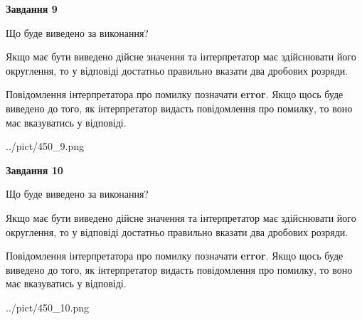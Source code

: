\documentclass[12pt, ukrainian]{article}
\begin{document}
{\begin {Large}
{\begin {center}\textbf{Завдання 9}\end {center}}\par
Що буде виведено за виконання? \par

Якщо має бути виведено дійсне значення та інтерпретатор має здійснювати його округлення, 
то у відповіді достатньо правильно вказати два дробових розряди.

Повідомлення інтерпретатора про помилку позначати \textbf{error}.
Якщо щось буде виведено до того, як інтерпретатор видасть повідомлення про помилку, 
то воно має вказуватись у відповіді. \par

\begin{center}
	{../pict/450_9.png}
\end{center}
\newpage

{\begin {center}\textbf{Завдання 10}\end {center}}\par
Що буде виведено за виконання? \par

Якщо має бути виведено дійсне значення та інтерпретатор має здійснювати його округлення, 
то у відповіді достатньо правильно вказати два дробових розряди.

Повідомлення інтерпретатора про помилку позначати \textbf{error}.
Якщо щось буде виведено до того, як інтерпретатор видасть повідомлення про помилку, 
то воно має вказуватись у відповіді. \par

\begin{center}
	{../pict/450_10.png}
\end{center}
\newpage

\end {Large}}
\end{document}
